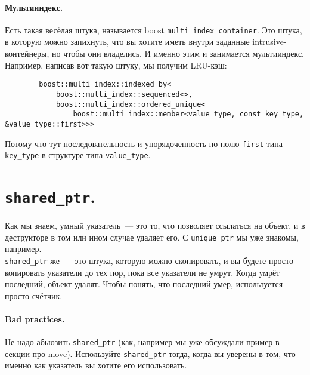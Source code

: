 \documentclass{article}
\begin{document}
    \paragraph{Мультииндекс.}
    Есть такая весёлая штука, называется boost \texttt{multi_index_container}. Это штука, в которую можно запихнуть, что вы хотите иметь внутри заданные intrusive-контейнеры, но чтобы они владелись. И именно этим и занимается мультииндекс. Например, написав вот такую штуку, мы получим LRU-кэш:
    \begin{verbatim}
        boost::multi_index::indexed_by<
            boost::multi_index::sequenced<>,
            boost::multi_index::ordered_unique<
                boost::multi_index::member<value_type, const key_type, &value_type::first>>>
    \end{verbatim}
    Потому что тут последовательность и упорядоченность по полю \texttt{first} типа \texttt{key_type} в структуре типа \texttt{value_type}.
    \section{\texttt{shared_ptr}.}
    Как мы знаем, умный указатель~--- это то, что позволяет ссылаться на объект, и в деструкторе в том или ином случае удаляет его. С \texttt{unique_ptr} мы уже знакомы, например.\\
    \texttt{shared_ptr} же~--- это штука, которую можно скопировать, и вы будете просто копировать указатели до тех пор, пока все указатели не умрут. Когда умрёт последний, объект удалят. Чтобы понять, что последний умер, используется просто счётчик.
    \paragraph{Bad practices.}
    Не надо абьюзить \texttt{shared_ptr} (как, например мы уже обсуждали \hyperref[абьюз shared_ptr]{пример} в секции про move). Используйте \texttt{shared_ptr} тогда, когда вы уверены в том, что именно как указатель вы хотите его использовать.
\end{document}
